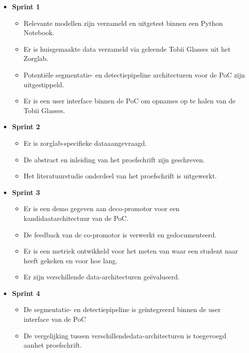 \begin{itemize}
    \item \textbf{Sprint 1}
        \begin{itemize}
            \item Relevante modellen zijn verzameld en uitgetest binnen een Python Notebook.
            \item Er is huisgemaakte data verzameld via geleende Tobii Glasses uit het Zorglab.
            \item Potentiële segmentatie- en detectiepipeline architecturen voor de PoC zijn uitgestippeld.
            \item Er is een user interface binnen de PoC om opnames op te halen van de Tobii Glasses.
        \end{itemize}
    \item \textbf{Sprint 2}
        \begin{itemize}
            \item Er is zorglab-specifieke data\newline aangevraagd.
            \item De abstract en inleiding van het proefschrift zijn geschreven.
            \item Het literatuurstudie onderdeel van het proefschrift is uitgewerkt.
        \end{itemize}
        \item \textbf{Sprint 3}
        \begin{itemize}
            \item Er is een demo gegeven aan de\newline co-promotor voor een kandidaat\newline architectuur van de PoC.
            \item De feedback van de co-promotor is verwerkt en gedocumenteerd.
            \item Er is een metriek ontwikkeld voor het meten van waar een student naar heeft gekeken en voor hoe lang.
            \item Er zijn verschillende data-architecturen geëvalueerd.
        \end{itemize}
    \item \textbf{Sprint 4}
        \begin{itemize}
            \item De segmentatie- en detectiepipeline is geïntegreerd binnen de user interface van de PoC
            \item De vergelijking tussen verschillende\newline data-architecturen is toegevoegd aan\newline het proefschrift.

\end{itemize}
\end{itemize}
